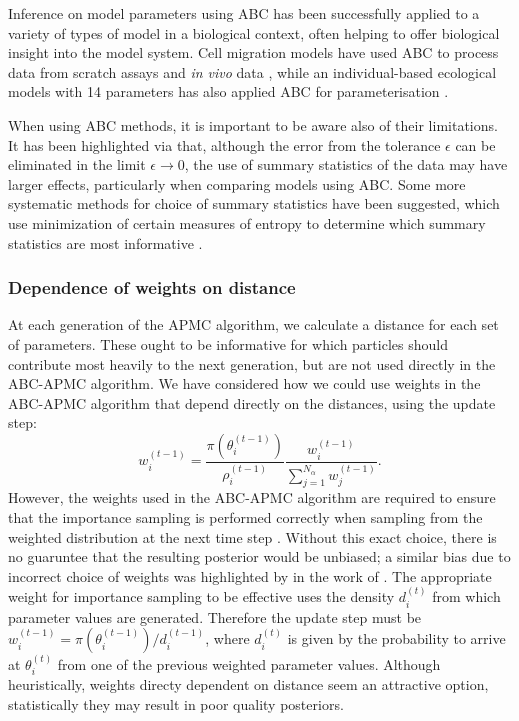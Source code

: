 \documentclass[twocolumn]{biophys}
\begin{document}
Inference on model parameters using ABC has been successfully applied to a variety of types of model in a biological context, often helping to offer biological insight into the model system.
Cell migration models have used ABC to process data from scratch assays \citep{johnston2014interpreting} and \textit{in vivo} data \citep{liepe2012calibrating}, while an individual-based ecological models with 14 parameters has also applied ABC for parameterisation \citep{van2015calibration}. 

When using ABC methods, it is important to be aware also of their limitations. 
It has been highlighted via \citet{robert2011lack} that, although the error from the tolerance $\epsilon$ can be eliminated in the limit $\epsilon \rightarrow 0$, the use of summary statistics of the data may have larger effects, particularly when comparing models using ABC.
Some more systematic methods for choice of summary statistics have been suggested, which use minimization of certain measures of entropy to determine which summary statistics are most informative \citep{nunes2010optimal}.

\subsubsection{Dependence of weights on distance}
At each generation of the APMC algorithm, we calculate a distance for each set of parameters.
These ought to be informative for which particles should contribute most heavily to the next generation, but are not used directly in the ABC-APMC algorithm.
We have considered how we could use weights in the ABC-APMC algorithm that depend directly on the distances, using the update step: 
\begin{equation*}
 w_{i}^{(t-1)} = \frac{\pi(\theta_i^{(t-1)})}{\rho_i^{(t-1)}} \frac{ w_i^{(t-1)} }{\sum_{j=1}^{N_{\alpha}} w_j^{(t-1)} }. 
\end{equation*}                                                                                                                                                       
However, the weights used in the ABC-APMC algorithm are required to ensure that the importance sampling is performed correctly when sampling from the weighted distribution at the next time step \citep{beaumont2009adaptive}.
Without this exact choice, there is no guaruntee that the resulting posterior would be unbiased; a similar bias due to incorrect choice of weights was highlighted by \citet{beaumont2009adaptive} in the work of \citet{sisson2007sequential}.
The appropriate weight for importance sampling to be effective uses the density $d_i^{(t)}$ from which parameter values are generated.
Therefore the update step must be $w_i^{(t-1)} = \pi(\theta_i^{(t-1)})/d_i^{(t-1)}$, where $d_i^{(t)} $ is given by the probability to arrive at $\theta_i^{(t)}$ from one of the previous weighted parameter values. 
Although heuristically, weights directy dependent on distance seem an attractive option, statistically they may result in poor quality posteriors.
\end{document}
